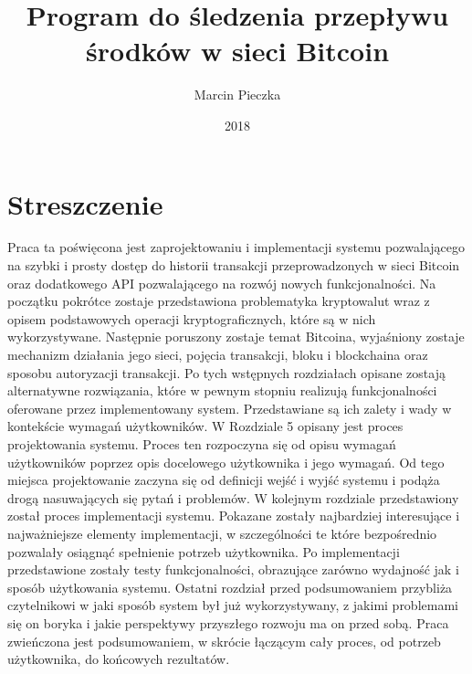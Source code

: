 \documentclass[12pt, en, eng, twoside, final]{mgr}
\begin{document}
\title{Program do śledzenia przepływu środków w sieci Bitcoin}
\date{2018}
\author{Marcin Pieczka}
\maketitle

\tableofcontents

\pagebreak 

\section*{Streszczenie}
Praca ta poświęcona jest zaprojektowaniu i implementacji systemu pozwalającego na szybki i prosty dostęp do historii transakcji przeprowadzonych w sieci Bitcoin oraz dodatkowego API pozwalającego na rozwój nowych funkcjonalności. Na początku pokrótce zostaje przedstawiona problematyka kryptowalut wraz z opisem podstawowych operacji kryptograficznych, które są w nich wykorzystywane. Następnie poruszony zostaje temat Bitcoina, wyjaśniony zostaje mechanizm działania jego sieci, pojęcia transakcji, bloku i blockchaina oraz sposobu autoryzacji transakcji. Po tych wstępnych rozdziałach opisane zostają alternatywne rozwiązania, które w pewnym stopniu realizują funkcjonalności oferowane przez implementowany system. Przedstawiane są ich zalety i wady w kontekście wymagań użytkowników. W Rozdziale 5 opisany jest proces projektowania systemu. Proces ten rozpoczyna się od opisu wymagań użytkowników poprzez opis docelowego użytkownika i jego wymagań. Od tego miejsca projektowanie zaczyna się od definicji wejść i wyjść systemu i podąża drogą nasuwających się pytań i problemów. W kolejnym rozdziale przedstawiony został proces implementacji systemu. Pokazane zostały najbardziej interesujące i najważniejsze elementy implementacji, w szczególności te które bezpośrednio pozwalały osiągnąć spełnienie potrzeb użytkownika. Po implementacji przedstawione zostały testy funkcjonalności, obrazujące zarówno wydajność jak i sposób użytkowania systemu. Ostatni rozdział przed podsumowaniem przybliża czytelnikowi w jaki sposób system był już wykorzystywany, z jakimi problemami się on boryka i jakie perspektywy przyszłego rozwoju ma on przed sobą. Praca zwieńczona jest podsumowaniem, w skrócie łączącym cały proces, od potrzeb użytkownika, do końcowych rezultatów. 
\end{document}
